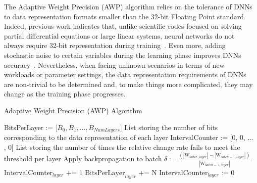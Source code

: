 The Adaptive Weight Precision (AWP) algorithm relies on the tolerance of DNNs to data representation formats smaller than the 32-bit Floating Point standard.
Indeed, previous work indicates that,
unlike scientific codes focused on solving partial differential equations or large linear systems,
neural networks do not always require 32-bit representation during training~\cite{bottou08, gupta15}. 
Even more, adding stochastic noise to certain variables during the learning phase
improves DNNs accuracy~\cite{murray94, bishop95, aud13}.
Nevertheless, when facing unknown scenarios in terms of new workloads or parameter settings,
the data representation requirements of DNNs 
are non-trivial to be determined and, to make things more complicated, they may change as the training phase progresses.

\begin{algorithm}%
\caption{Adaptive Weight Precision (AWP) Algorithm}
\label{alg:norm}
{\fontsize{9}{9}\selectfont
\begin{algorithmic}[1]
    \State BitsPerLayer := [$B_0, B_1, \hdots, B_{NumLayers}$]
    \Comment List storing the number of bits corresponding to the data representation of each layer
    \State IntervalCounter := [0, 0, $\hdots$, 0]
    \Comment List storing the number of times the relative change rate
             fails to meet the threshold per layer
        \State Apply backpropagation to batch
            \State $\delta := \frac{(|\text{W}_{batch, layer}| - |\text{W}_{batch-1, layer}|)}{|\text{W}_{batch-1, layer}|}$
                \State $\text{IntervalCounter}_{layer}$ +=  1
            \EndIf
                \State $\text{BitsPerLayer}_{layer}$ += N
                \State $\text{IntervalCounter}_{layer}$ := 0
            \EndIf
        \EndFor
        \EndFor
\end{algorithmic}
}
\end{algorithm}

